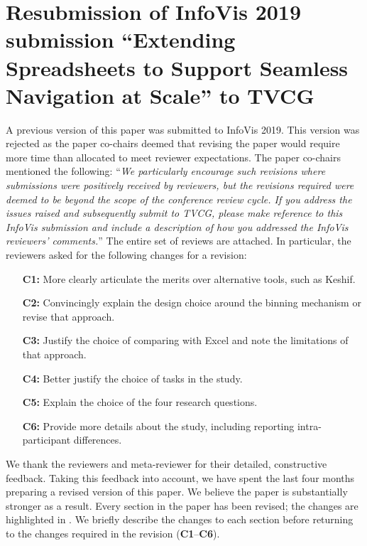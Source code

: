 

\section*{Resubmission of InfoVis 2019 submission ``Extending Spreadsheets to Support Seamless
Navigation at Scale'' to TVCG}

A previous version of this paper was submitted to InfoVis 2019. This version was rejected as the paper co-chairs deemed that revising the paper would require more time than allocated to meet reviewer expectations. The paper co-chairs mentioned the following: ``\textit{We particularly encourage such revisions where submissions were positively received by reviewers, but the revisions required were deemed to be beyond the scope of the conference review cycle. If you address the issues raised and subsequently submit to TVCG, please make reference to this  InfoVis submission and include a description of how you addressed the InfoVis reviewers' comments.}'' The entire set of reviews are attached. In particular, the reviewers asked for the following changes for a revision: 
\begin{itemize}
    \item[\textbf{C1:}] More clearly articulate the merits over alternative tools, such as Keshif. 
     \item[\textbf{C2:}] Convincingly explain the design choice around the binning mechanism or revise
    that approach.
    \item[\textbf{C3:}] Justify the choice of comparing with Excel and note the limitations of that
    approach.
     \item[\textbf{C4:}] Better justify the choice of tasks in the study. 
     \item[\textbf{C5:}] Explain the choice of the four research questions.
     \item[\textbf{C6:}] Provide more details about the study, including reporting intra-participant
    differences.
\end{itemize} 
We thank the reviewers and meta-reviewer for their detailed,
constructive feedback. 
Taking this feedback into account, 
we have spent the last four months 
preparing a revised version of this paper.
We believe the paper is substantially
stronger as a result. 
Every section in the paper has been revised;
the changes are highlighted in .
We briefly describe the changes to each section
before returning to the changes required in the revision 
({\bf C1}--{\bf C6}).
